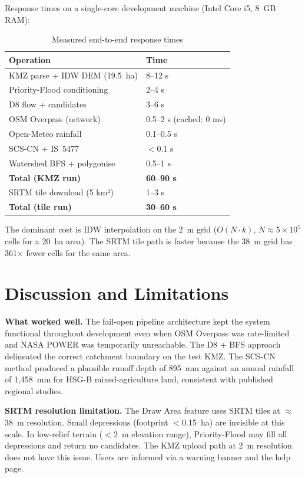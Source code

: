 \documentclass[manuscript,screen,review,nonacm]{acmart}
\begin{document}
Response times on a single-core development machine (Intel Core i5, 8~GB RAM):

\begin{table}[h]
  \caption{Measured end-to-end response times}
  \label{tab:perf}
  \begin{tabular}{p{4.0cm}p{3.2cm}}
    \toprule
    Operation & Time \\
    \midrule
    KMZ parse + IDW DEM (19.5~ha) & 8--12 s \\
    Priority-Flood conditioning & 2--4 s \\
    D8 flow + candidates & 3--6 s \\
    OSM Overpass (network) & 0.5--2 s (cached: 0 ms) \\
    Open-Meteo rainfall & 0.1--0.5 s \\
    SCS-CN + IS~5477 & $<$0.1 s \\
    Watershed BFS + polygonise & 0.5--1 s \\
    \textbf{Total (KMZ run)} & \textbf{60--90 s} \\
    SRTM tile download (5 km²) & 1--3 s \\
    \textbf{Total (tile run)} & \textbf{30--60 s} \\
    \bottomrule
  \end{tabular}
\end{table}

The dominant cost is IDW interpolation on the 2~m grid ($O(N \cdot k)$,
$N \approx 5 \times 10^5$ cells for a 20~ha area). The SRTM tile path is
faster because the 38~m grid has 361$\times$ fewer cells for the same area.

\section{Discussion and Limitations}
\label{sec:discussion}

\textbf{What worked well.} The fail-open pipeline architecture kept the
system functional throughout development even when OSM Overpass was
rate-limited and NASA POWER was temporarily unreachable. The D8 + BFS
approach delineated the correct catchment boundary on the test KMZ.
The SCS-CN method produced a plausible runoff depth of 895~mm against an
annual rainfall of 1,458~mm for HSG-B mixed-agriculture land, consistent
with published regional studies.

\textbf{SRTM resolution limitation.} The Draw Area feature uses SRTM
tiles at $\approx$38~m resolution. Small depressions (footprint
$<$0.15~ha) are invisible at this scale. In low-relief terrain ($<$2~m
elevation range), Priority-Flood may fill all depressions and return no
candidates. The KMZ upload path at 2~m resolution does not have this
issue. Users are informed via a warning banner and the help page.
\end{document}
